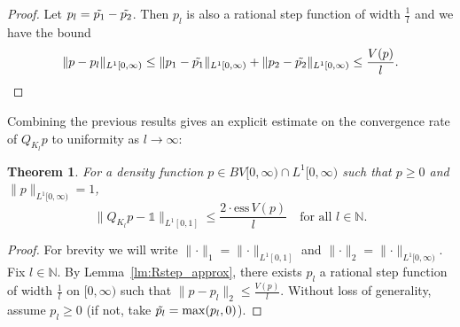 \documentclass[a4paper]{article}
\newtheorem{theorem}{Theorem}%
\theoremstyle{definition}
\numberwithin{equation}{section}
\numberwithin{theorem}{section}
\newcommand{\ess}{\mathrm{ess}\,}
\begin{document}
{\begin{proof}
    Let $p_l = \Tilde{p_1} - \Tilde{p_2}$. Then $p_l$ is also a rational step function of width $\frac{1}{l}$ and we have the bound
    \begin{equation*}
        \lVert p-p_l\rVert_{ L^1[0,\infty)} \leq \lVert p_1-\Tilde{p_1}\rVert_{ L^1[0,\infty)} + \lVert p_2-\Tilde{p_2}\rVert_{ L^1[0,\infty)} \leq \frac{V(p)}{l}.
    \end{equation*}
\end{proof}

Combining the previous results gives an explicit estimate on the convergence rate of $Q_{K_l}p$ to uniformity as $l\rightarrow\infty$:
\begin{theorem} \label{thm:bv_convergence_rate}
    For a density function $p\in BV[0,\infty)\cap L^1[0,\infty)$ such that $p\geq 0$ and $\lVert p \rVert_{ L^1[0,\infty)}=1$,
    \begin{equation*}
        \lVert Q_{K_l}p-\mathds{1}\rVert_{ L^1[0,1]}\leq\frac{2\cdot\ess V(p)}{l}\quad\text{for all $l\in\mathbb{N}$}.
    \end{equation*}
\end{theorem}
\begin{proof}
    For brevity we will write $\lVert\cdot\rVert_1=\lVert\cdot\rVert_{ L^1[0,1]}$ and $\lVert\cdot\rVert_2=\lVert\cdot\rVert_{ L^1[0,\infty)}$. Fix $l\in\mathbb{N}$. By Lemma~\ref{lm:Rstep_approx}, there exists $p_l$ a rational step function of width $\frac{1}{l}$ on $[0,\infty)$ such that $\lVert p-p_l\rVert_2\leq\frac{V(p)}{l}$. Without loss of generality, assume $p_l\geq0$ (if not, take $\Tilde{p_l} = \max(p_l,0)$).
    

\end{proof}}
\end{document}
